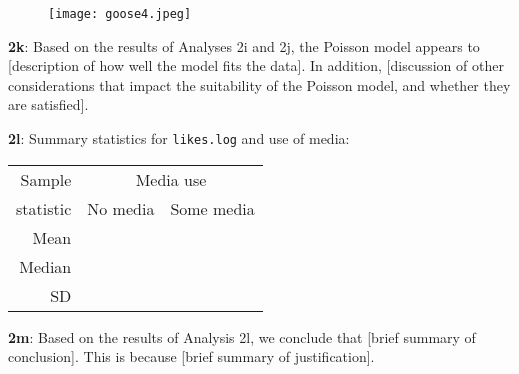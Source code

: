 \documentclass[a4paper,12pt]{article}
\begin{document}
\begin{figure}[H]
     \centering
     \texttt{[image: goose4.jpeg]}
\end{figure}

\textbf{2k}: Based on the results of Analyses 2i and 2j, the Poisson model appears to [description of how well the model fits the data]. In addition, [discussion of other considerations that impact the suitability of the Poisson model, and whether they are satisfied].\bigskip




\textbf{2l}: Summary statistics for \texttt{likes.log} and use of media:

\begin{center}
\begin{tabular}{| r | r | r |}\hline
Sample & \multicolumn{2}{|c|}{Media use}\\
statistic & No media & Some media \\\hline
Mean &  & \\
Median &  & \\
SD &  &   \\\hline
\end{tabular}
\end{center}

\textbf{2m}: Based on the results of Analysis 2l, we conclude that [brief summary of conclusion]. This is because [brief summary of justification].
\end{document}
